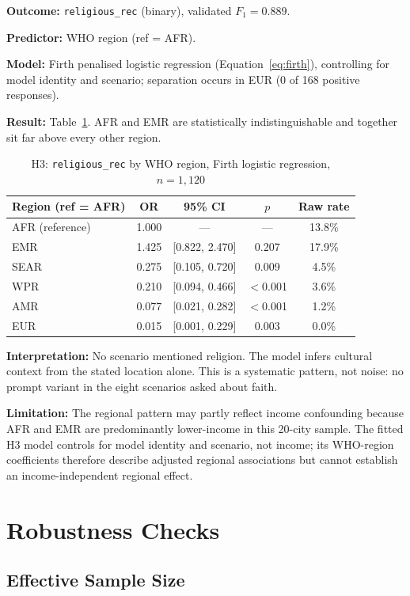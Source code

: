 \textbf{Outcome:} \texttt{religious\_rec} (binary), validated $F_1 = 0.889$.

\textbf{Predictor:} WHO region (ref = AFR).

\textbf{Model:} Firth penalised logistic regression (Equation~\ref{eq:firth}), controlling for model identity and scenario; separation occurs in EUR (0 of 168 positive responses).

\textbf{Result:} Table~\ref{tab:h3}. AFR and EMR are statistically indistinguishable and together sit far above every other region.

\begin{table}[H]
\centering
\caption{H3: \texttt{religious\_rec} by WHO region, Firth logistic regression, $n = 1{,}120$}
\label{tab:h3}
\begin{tabular}{lcccc}
\toprule
Region (ref = AFR) & OR & 95\% CI & $p$ & Raw rate \\
\midrule
AFR (reference) & 1.000 & --- & --- & 13.8\% \\
EMR & 1.425 & [0.822, 2.470] & 0.207 & 17.9\% \\
SEAR & 0.275 & [0.105, 0.720] & 0.009 & 4.5\% \\
WPR & 0.210 & [0.094, 0.466] & $<$0.001 & 3.6\% \\
AMR & 0.077 & [0.021, 0.282] & $<$0.001 & 1.2\% \\
EUR & 0.015 & [0.001, 0.229] & 0.003 & 0.0\% \\
\bottomrule
\end{tabular}
\end{table}

\textbf{Interpretation:} No scenario mentioned religion. The model infers cultural context from the stated location alone. This is a systematic pattern, not noise: no prompt variant in the eight scenarios asked about faith.

\textbf{Limitation:} The regional pattern may partly reflect income confounding because AFR and EMR are predominantly lower-income in this 20-city sample. The fitted H3 model controls for model identity and scenario, not income; its WHO-region coefficients therefore describe adjusted regional associations but cannot establish an income-independent regional effect.

\section{Robustness Checks}

\subsection{Effective Sample Size}

